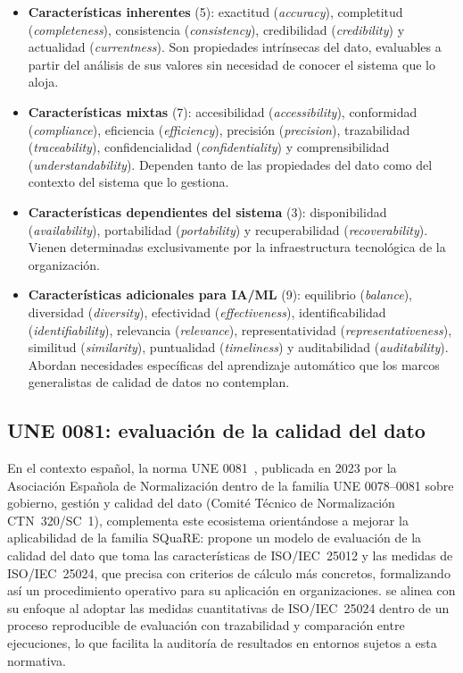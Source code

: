\begin{itemize}
  \item \textbf{Características inherentes} (5): exactitud
    (\emph{accuracy}), completitud (\emph{completeness}), consistencia
    (\emph{consistency}), credibilidad (\emph{credibility}) y actualidad
    (\emph{currentness}). Son propiedades intrínsecas del dato, evaluables
    a partir del análisis de sus valores sin necesidad de conocer el sistema
    que lo aloja.

  \item \textbf{Características mixtas} (7): accesibilidad
    (\emph{accessibility}), conformidad (\emph{compliance}), eficiencia
    (\emph{efficiency}), precisión (\emph{precision}), trazabilidad
    (\emph{traceability}), confidencialidad (\emph{confidentiality}) y
    comprensibilidad (\emph{understandability}). Dependen tanto de las
    propiedades del dato como del contexto del sistema que lo gestiona.

  \item \textbf{Características dependientes del sistema} (3):
    disponibilidad (\emph{availability}), portabilidad (\emph{portability})
    y recuperabilidad (\emph{recoverability}). Vienen determinadas
    exclusivamente por la infraestructura tecnológica de la organización.

  \item \textbf{Características adicionales para IA/ML} (9): equilibrio
    (\emph{balance}), diversidad (\emph{diversity}), efectividad
    (\emph{effectiveness}), identificabilidad (\emph{identifiability}),
    relevancia (\emph{relevance}), representatividad
    (\emph{representativeness}), similitud (\emph{similarity}), puntualidad
    (\emph{timeliness}) y auditabilidad (\emph{auditability}). Abordan
    necesidades específicas del aprendizaje automático que los marcos
    generalistas de calidad de datos no contemplan.
\end{itemize}


\subsection[\ac{UNE} 0081: evaluación de la calidad del dato]{\ac{UNE} 0081: evaluación de la calidad del dato}
\label{sec:une0081}

En el contexto español, la norma \ac{UNE} 0081~\citep{une0081}, publicada
en 2023 por la Asociación Española de Normalización dentro de la familia
\ac{UNE} 0078--0081 sobre gobierno, gestión y calidad del dato (Comité Técnico
de Normalización CTN~320/SC~1), complementa este ecosistema orientándose
a mejorar la aplicabilidad de la familia \ac{SQuaRE}: propone un modelo de
evaluación de la calidad del dato que toma las características de
\ac{ISO}/\ac{IEC}~25012 y las medidas de \ac{ISO}/\ac{IEC}~25024, que precisa
con criterios de cálculo más concretos, formalizando así un procedimiento
operativo para su aplicación en organizaciones.  \dataqual se alinea con su enfoque al adoptar
las medidas cuantitativas de \ac{ISO}/\ac{IEC}~25024 dentro de un proceso
reproducible de evaluación con trazabilidad y comparación entre
ejecuciones, lo que facilita la auditoría de resultados en entornos
sujetos a esta normativa.

